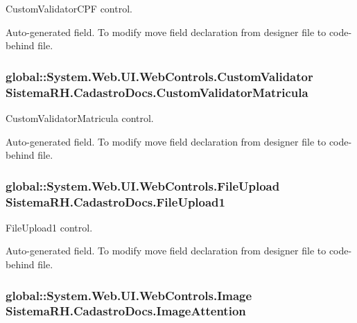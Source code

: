 CustomValidatorCPF control. 

Auto-\/generated field. To modify move field declaration from designer file to code-\/behind file. \hypertarget{class_sistema_r_h_1_1_cadastro_docs_a864fa2442799138c4e79ef11d7660289}{
\subsubsection[{CustomValidatorMatricula}]{\setlength{\rightskip}{0pt plus 5cm}global::System.Web.UI.WebControls.CustomValidator {\bf SistemaRH.CadastroDocs.CustomValidatorMatricula}}}
\label{class_sistema_r_h_1_1_cadastro_docs_a864fa2442799138c4e79ef11d7660289}


CustomValidatorMatricula control. 

Auto-\/generated field. To modify move field declaration from designer file to code-\/behind file. \hypertarget{class_sistema_r_h_1_1_cadastro_docs_a6cb09b34eabc565682fdf585b60058c2}{
\subsubsection[{FileUpload1}]{\setlength{\rightskip}{0pt plus 5cm}global::System.Web.UI.WebControls.FileUpload {\bf SistemaRH.CadastroDocs.FileUpload1}}}
\label{class_sistema_r_h_1_1_cadastro_docs_a6cb09b34eabc565682fdf585b60058c2}


FileUpload1 control. 

Auto-\/generated field. To modify move field declaration from designer file to code-\/behind file. \hypertarget{class_sistema_r_h_1_1_cadastro_docs_a3713658dee32d47772744bc93a4a9672}{
\subsubsection[{ImageAttention}]{\setlength{\rightskip}{0pt plus 5cm}global::System.Web.UI.WebControls.Image {\bf SistemaRH.CadastroDocs.ImageAttention}}}
\label{class_sistema_r_h_1_1_cadastro_docs_a3713658dee32d47772744bc93a4a9672}


